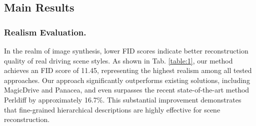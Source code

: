 \begin{table}[t]
	\centering
	\caption{
		Comparison of generation fidelity and controllability across different driving-view generation methods on the NuScenes {validation} set. Panacea* denotes our reproduced results based on the officially provided generated dataset.  Outcomes demonstrating superior performance are highlighted in \textbf{bold}. $\uparrow$ / $\downarrow$ indicates that a higher/lower value is better. }
	\label{table:1}
\end{table}
\subsection{Main Results}
\subsubsection{Realism Evaluation.}
In the realm of image synthesis, lower FID scores indicate better reconstruction quality of real driving scene styles. As shown in Tab. \ref{table:1}, our method achieves an FID score of 11.45, representing the highest realism among all tested approaches.
Our approach significantly outperforms existing solutions, including MagicDrive and Panacea, and even surpasses the recent state-of-the-art method Perldiff by approximately 16.7\%. This substantial improvement demonstrates that fine-grained hierarchical descriptions are highly effective for scene reconstruction.
